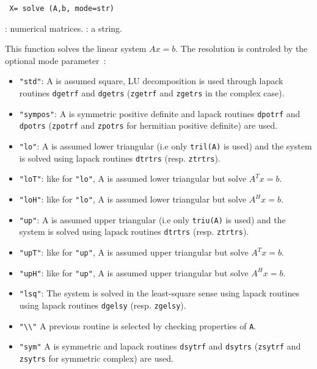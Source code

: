 
\begin{mandesc}
\end{mandesc}
\begin{calling_sequence}
\begin{verbatim}
 X= solve (A,b, mode=str)
\end{verbatim}
\end{calling_sequence}
\begin{parameters}
  \begin{varlist}
    : numerical matrices.
    : a string.
  \end{varlist}
\end{parameters}

\begin{mandescription}
This function solves the linear system $Ax = b$. The resolution is 
controled by the optional mode parameter~:
\begin{itemize}
  \item \verb+"std"+: A is assumed square, LU decomposition is used 
    through lapack routines \verb+dgetrf+ and \verb+dgetrs+ 
    (\verb+zgetrf+ and \verb+zgetrs+ in the complex case).
  \item \verb+"sympos"+: A is symmetric positive definite and lapack routines 
    \verb+dpotrf+ and \verb+dpotrs+ (\verb+zpotrf+ and \verb+zpotrs+ for hermitian positive definite) are used. 
  \item \verb+"lo"+: A is assumed lower triangular (i.e only \verb+tril(A)+ is used) and the 
    system is solved using lapack routines \verb+dtrtrs+ (resp. \verb+ztrtrs+).
  \item \verb+"loT"+: like for \verb+"lo"+, A is assumed lower triangular but solve $A^T x=b$.
  \item \verb+"loH"+: like for \verb+"lo"+, A is assumed lower triangular but solve $A^H x=b$.
  \item \verb+"up"+: A is assumed upper triangular (i.e only \verb+triu(A)+ is used) and the system is 
    solved using lapack routines \verb+dtrtrs+ (resp. \verb+ztrtrs+).
  \item \verb+"upT"+: like for \verb+"up"+, A is assumed upper triangular but solve $A^T x=b$.
  \item \verb+"upH"+: like for \verb+"up"+, A is assumed upper triangular but solve $A^H x=b$.
  \item \verb+"lsq"+: The system is solved in the least-square sense using 
    lapack routines using lapack routines \verb+dgelsy+ (resp. \verb+zgelsy+).
  \item \verb+"\\"+ A previous routine is selected by checking properties of \verb+A+.
  \item \verb+"sym"+ A is symmetric and lapack routines 
    \verb+dsytrf+ and \verb+dsytrs+ (\verb+zsytrf+ and \verb+zsytrs+ for symmetric complex) are used. 
\end{itemize}
\end{mandescription}

